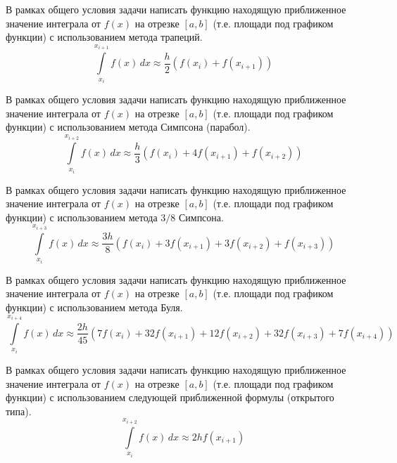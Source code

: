 
\begin{zztask}
В рамках общего условия задачи написать функцию находящую приближенное значение 
интеграла от $f(x)$ на отрезке $[a, b]$ (т.е. площади под графиком функции)
с использованием метода трапеций. 
\[
\int\limits_{x_i}^{x_{i+1}} f(x)\,dx \approx \frac{h}{2} \left(f(x_i)+f(x_{i+1})\right)
\]
\end{zztask}


\begin{zztask}
В рамках общего условия задачи написать функцию находящую приближенное значение 
интеграла от $f(x)$ на отрезке $[a, b]$ (т.е. площади под графиком функции)
с использованием метода Симпсона (парабол).
\[
\int\limits_{x_i}^{x_{i+2}} f(x)\,dx \approx 
\frac{h}{3} \left(f(x_i) + 4 f(x_{i+1}) + f(x_{i+2})\right)
\]
\end{zztask}


\begin{zztask}
В рамках общего условия задачи написать функцию находящую приближенное значение 
интеграла от $f(x)$ на отрезке $[a, b]$ (т.е. площади под графиком функции)
с использованием метода $3/8$ Симпсона.
\[
\int\limits_{x_i}^{x_{i+3}} f(x)\,dx \approx 
\frac{3h}{8} \left(f(x_i) + 3 f(x_{i+1}) + 3 f(x_{i+2}) + f(x_{i+3})\right)
\]
\end{zztask}


\begin{zztask}
В рамках общего условия задачи написать функцию находящую приближенное значение 
интеграла от $f(x)$ на отрезке $[a, b]$ (т.е. площади под графиком функции)
с использованием метода Буля.
\[
\int\limits_{x_i}^{x_{i+4}} f(x)\,dx \approx 
\frac{2h}{45} \left(7 f(x_i) + 32 f(x_{i+1}) + 12 f(x_{i+2}) + 32 f(x_{i+3}) + 7 f(x_{i+4})\right)
\]
\end{zztask}


\begin{zztask}
В рамках общего условия задачи написать функцию находящую приближенное значение 
интеграла от $f(x)$ на отрезке $[a, b]$ (т.е. площади под графиком функции)
с использованием следующей приближенной формулы (открытого типа). 
\[
\int\limits_{x_i}^{x_{i+2}} f(x)\,dx \approx 2h f(x_{i+1})
\]
\end{zztask}


